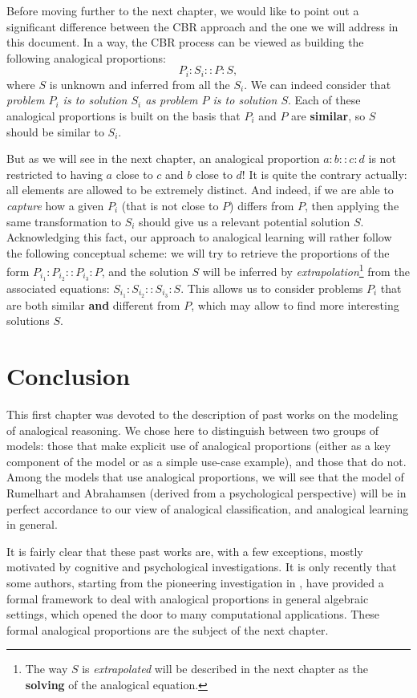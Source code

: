 Before moving further to the next chapter, we would like to point out a
significant difference between the CBR approach and the one we will address in
this document. In a way, the CBR process can be viewed as building the
following analogical proportions:
$$P_i:S_i :: P : S, $$
where $S$ is unknown and inferred from all the $S_i$. We can indeed consider
that \textit{problem $P_i$ is to solution $S_i$ as problem $P$ is to solution
$S$}. Each of these analogical proportions is built on the basis that $P_i$ and
$P$ are \textbf{similar}, so $S$ should be similar to $S_i$.

But as we will see in the next chapter, an analogical proportion $a:b::c:d$ is
not restricted to having $a$ close to $c$ and $b$ close to $d$! It is quite the
contrary actually: all elements are allowed to be extremely distinct. And
indeed, if we are able to \textit{capture} how a given $P_i$ (that is not close
to $P$) differs from $P$, then applying the same transformation to $S_i$ should
give us a relevant potential solution $S$.  Acknowledging this fact, our
approach to analogical learning will rather follow the following conceptual
scheme: we will try to retrieve the proportions of the form $P_{i_1} : P_{i_2}
:: P_{i_3} : P$, and the solution $S$ will be inferred by
\textit{extrapolation}\footnote{The way $S$ is \textit{extrapolated} will be
described in the next chapter as the \textbf{solving} of the analogical
equation.} from the associated equations: $S_{i_1} : S_{i_2} :: S_{i_3} :
S$. This allows us to consider problems $P_i$ that are both similar
\textbf{and} different from $P$, which may allow to find more interesting
solutions $S$.

\section*{Conclusion}

This first chapter was devoted to the description of past works on the modeling
of analogical reasoning. We chose here to distinguish between two groups of
models: those that make explicit use of analogical proportions (either as a key
component of the model or as a simple use-case example), and those that do not.
Among the models that use analogical proportions, we will see that the model
of Rumelhart and Abrahamsen (derived from a psychological perspective) will be
in perfect accordance to our view of analogical classification, and analogical
learning in general.

It is fairly clear that these past works are, with a few exceptions, mostly
motivated by cognitive and psychological investigations. It is only recently
that some authors, starting from the pioneering investigation in \cite{Lep04},
have provided a formal framework to deal with analogical proportions in general
algebraic settings, which opened the door to many computational applications.
These formal analogical proportions are the subject of the next chapter.
